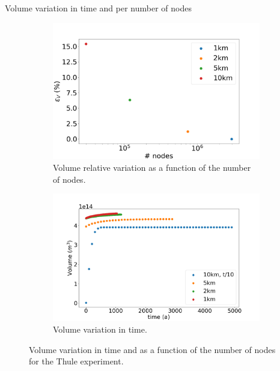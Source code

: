 \documentclass[11pt]{beamer}
\begin{document}
		\begin{frame}{Volume variation in time and per number of nodes}
			\begin{figure}
				\centering
				\begin{subfigure}{.5\textwidth}
					\centering
					\includegraphics[width=1.1\linewidth]{../fig/Volume_THULE_full_all_res_vs_num_nodes.png}
					\caption{Volume relative variation as a function of the number of nodes.}
					\label{H_THULE_VS_NODES}
				\end{subfigure}%
				\begin{subfigure}{.5\textwidth}
					\centering
					\includegraphics[width=1.1\linewidth]{../fig/Volume_THULE_full_all_res_vs_time.png}
					\caption{Volume variation in time.}
					\label{VOLUME_THULE_VS_TIME}
				\end{subfigure}
				\caption{Volume variation in time and as a function of the number of nodes for the Thule experiment.}
				\label{H_THULE_VS_TIME_VS_NODES}
			\end{figure}
		\end{frame}
\end{document}
